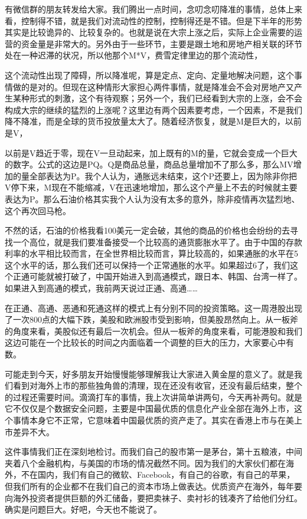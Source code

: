 \documentclass[UTF8, 12pt, a4paper]{ctexrep}
\begin{document}
有微信群的朋友转发给大家。我们腾出一点时间，念叨念叨降准的事情，总体上来看，控制得不错，就是我们对流动性的控制，控制得还是不错。但是下半年的形势其实是比较诡异的、比较复杂的。也就是说在大宗上涨之后，实际上企业需要的运营的资金量是非常大的。另外由于一些环节，主要是跟土地和房地产相关联的环节处在一种迟滞的状况，所以他那个M*V，费雪定律里边的那个流动性，

这个流动性出现了障碍，所以降准呢，算是定点、定向、定量地解决问题，这个事情做的是对的。但现在这种情形大家担心两件事情，就是降准会不会对房地产又产生某种形式的刺激，这个有待观察；另外一个，我们已经看到大宗的上涨，会不会构成大宗的继续的猛烈的上涨呢？这里边有两个因素要考虑，一个因素，不是我们降不降准，而是全球的货币投放量太大了。随着经济恢复，就是M是巨大的，以前是V，

以前是V趋近于零，现在V一旦动起来，加上既有的M的量，它就会变成一个巨大的数字。公式的这边是PQ。Q是商品总量，商品总量增加不了那么多，那么MV增加的量全部表达为P。我个人认为，通胀远未结束，这个P还要上，因为除非你把V停下来，M现在不能缩减，V在迅速地增加，那么这个产量上不去的时候就主要表达为P。那么石油价格其实我个人认为没有太多的意外，除非疫情再次猛烈地、这个再次回马枪。

不然的话，石油的价格我看100美元一定会破，其他的商品的价格也会纷纷的去寻找一个高位，就是我们要准备接受一个比较高的通货膨胀水平了。由于中国的存款利率的水平相比较而言，在全世界相比较而言，算比较高的，如果通胀的水平在5这个水平的话，那么我们还可以保持一个正常通胀的水平。如果超过6了，我们这个正通可能就被打破了，中国开始进入到高通模式，跟日本、韩国、台湾一样了。如果进入到高通的模式，我前两天说过正通、高通……

在正通、高通、恶通和死通这样的模式上有分别不同的投资策略。这一周港股出现了一次800点的大幅下跌，美股和欧洲股市受到影响，但美股昂然向上。从一板斧的角度来看，美股似还有最后一次机会。但从一板斧的角度来看，可能港股和我们这边可能在一个比较长的时间之内面临着一个调整的巨大的压力，大家要心中有数。

可能走到今天，好多朋友开始慢慢能够理解我让大家进入黄金屋的意义了。就是我们看到对海外上市的那些独角兽的清理，现在还没有收官，还没有最后结束，整个的过程还需要时间。滴滴打车的事情，我上次讲简单讲两句，今天再补两句。就是它不仅仅是个数据安全问题，主要是中国最优质的信息化产业全部在海外上市，这个事情本身它不正常，它意味着中国最优质的资产走了。其实在香港上市与在美上市差异不大。

这件事情我们正在深刻地检讨。而我们自己的股市第一是茅台，第十五粮液，中间夹着八个金融机构，与美国的市场的情况截然不同。因为我们的大家伙们都在海外，不在国内，我们有自己的微软、Facebook，有自己的谷歌，有自己的苹果，但我们所有的企业都不在我们自己的资本市场上做表达。优质资产在海外，每年要向海外投资者提供巨额的外汇储备，要把卖袜子、卖衬衫的钱凑齐了给他们分红。确实是问题巨大。好吧，今天也不能说了。
\end{document}
